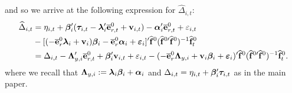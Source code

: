 \documentclass[12pt,fleqn]{article}
\begin{document}
and so we arrive at the following expression for $\widehat \Delta_{i,t}$:
\begin{align}
\widehat \Delta_{i,t} & = \eta_{i,t} + \boldsymbol{\beta}_i'(\boldsymbol{\tau}_{i,t}  - \boldsymbol{\lambda}_i'\overline{\mathbf{e}}_{r,t}^0  + \mathbf{v}_{i,t}) - \boldsymbol{\alpha}_i'\overline{\mathbf{e}}_{r,t}^0 + \varepsilon_{i,t}\notag\\
& - [ (- \overline{\mathbf{e}}_{r}^0\boldsymbol{\lambda}_i  + \mathbf{v}_i)\boldsymbol{\beta}_i  - \overline{\mathbf{e}}_{r}^0\boldsymbol{\alpha}_i +  \boldsymbol{\varepsilon}_{i} ]' \widehat{\mathbf{f}}^{0} (\widehat{\mathbf{f}}^{0\prime}\widehat{\mathbf{f}}^0)^{-1}\widehat{\mathbf{f}}_t^0 \notag\\
& = \Delta_{i,t} - \boldsymbol{\Lambda}_{y,i}'\overline{\mathbf{e}}_{r,t}^0 + \boldsymbol{\beta}_i'\mathbf{v}_{i,t} + \varepsilon_{i,t}  - ( - \overline{\mathbf{e}}_{r}^0\boldsymbol{\Lambda}_{y,i} + \mathbf{v}_i\boldsymbol{\beta}_i+  \boldsymbol{\varepsilon}_{i} )' \widehat{\mathbf{f}}^{0} (\widehat{\mathbf{f}}^{0\prime}\widehat{\mathbf{f}}^0)^{-1}\widehat{\mathbf{f}}_t^0  .
\end{align}
where we recall that $\boldsymbol{\Lambda}_{y,i} :=  \boldsymbol{\lambda}_i\boldsymbol{\beta}_i + \boldsymbol{\alpha}_i$ and $\Delta_{i,t} = \eta_{i,t} + \boldsymbol{\beta}_i'\boldsymbol{\tau}_{i,t}$ as in the main paper.
\end{document}
